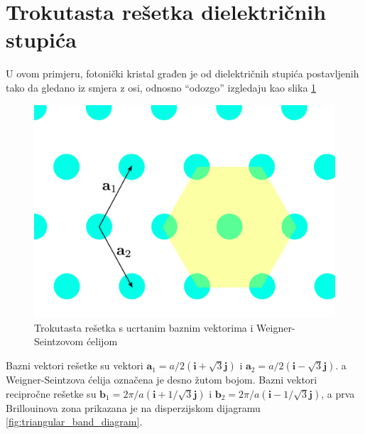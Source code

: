 \documentclass[utf8, seminar]{fer}
\begin{document}
\section{Trokutasta rešetka dielektričnih stupića}

U ovom primjeru, fotonički kristal građen je od dielektričnih stupića
postavljenih tako da gledano iz smjera z osi, odnosno ``odozgo'' izgledaju kao
slika \ref{fig:triangular_lattice}

\begin{figure}[h]
	\centering
	\includegraphics[width = 1.0\linewidth]{./images/triangular_lattice.pdf}
	\caption{Trokutasta rešetka s ucrtanim baznim vektorima i Weigner-Seintzovom
	ćelijom}
	\label{fig:triangular_lattice}
\end{figure}

Bazni vektori rešetke su vektori
${\mathbf{a}_1 = a/2 (\mathbf{i} + \sqrt{3} \mathbf{j})}$ i
${\mathbf{a}_2 = a/2 (\mathbf{i} - \sqrt{3} \mathbf{j})}$.
a Weigner-Seintzova ćelija označena je desno žutom bojom.
Bazni vektori recipročne rešetke su
${\mathbf{b}_1 = 2 \pi/a( \mathbf{i} + 1/\sqrt{3} \mathbf{j})}$ i
${\mathbf{b}_2 = 2 \pi/a( \mathbf{i} - 1/\sqrt{3} \mathbf{j})}$,
a prva Brillouinova zona prikazana je na disperzijskom dijagramu
\ref{fig:triangular_band_diagram}.
\end{document}
